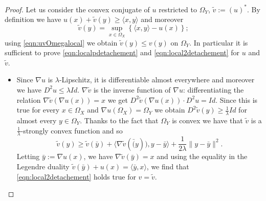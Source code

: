 \documentclass[reqno,12pt]{article}
\begin{document}
\begin{proof} 
Let us consider the convex conjugate of $u$ restricted to $\Omega_Y$, $\tilde{v}:= (u)^*$. By definition we have $u(x)+\tilde{v}(y) \geqslant \langle x, y \rangle $ and moreover
$$\tilde{v}(y) = \sup_{ x \in \Omega_X } \left\{ \langle x, y \rangle - u(x) \right\}; $$
using \eqref{eqn:uvOmegalocal} we obtain $\tilde{v}(y) \leqslant v(y)$ on $\Omega_Y$. In particular it is sufficient to prove \eqref{eqn:localpdetachement} and \eqref{eqn:local2detachement} for $u$ and $\tilde{v}$.
\begin{itemize}
\item[(i)] Since $\nabla u$ is $\lambda$-Lipschitz, it is differentiable almost everywhere and moreover we have $D^2u \leq \lambda Id$. $\nabla \tilde{v}$ is the inverse function of $\nabla u$: differentiating the relation $\nabla \tilde{v} ( \nabla u (x))=x$  we get $D^2 \tilde{v}  ( \nabla u (x) ) \cdot D^2 u =Id$. Since this is true for every $x \in \Omega_X$ and $\nabla u(\Omega_X)=\Omega_Y$ we obtain $D^2 \tilde{v}(y) \geq \frac 1{\lambda} Id$ for almost every $y \in \Omega_Y$. Thanks to the fact that $\Omega_Y$ is convex we have that $\tilde{v}$ is a $\frac 1{\lambda}$-strongly convex function and so 
$$ \tilde{v}(y) \geqslant \tilde{v}(\bar{y}) + \langle \nabla \tilde{v} (\bar(y)), y- \bar{y}\rangle + \frac 1{2\lambda} \| y- \bar{y}\|^2.$$
Letting $\bar{y}:=\nabla u (x)$, we have $\nabla \tilde{v} (\bar{y})=x$ and using the equality in the Legendre duality $\tilde{v}(\bar{y}) + u (x) = \langle \bar{y} , x\rangle$, we find that \eqref{eqn:local2detachement} holds true for $v= \tilde{v}$.
    


\end{itemize}
\end{proof}
\end{document}
